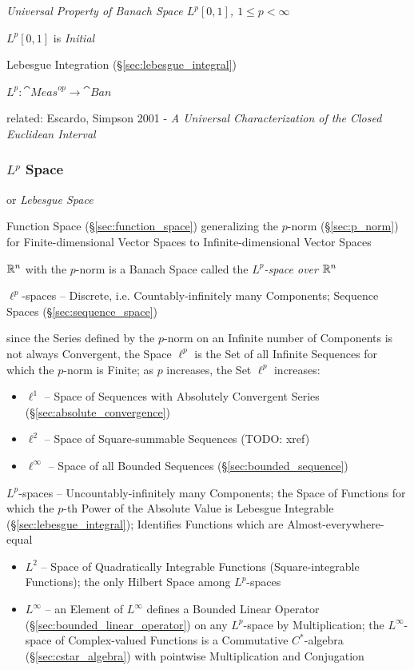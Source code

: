 \emph{Universal Property of Banach Space $L^p[0,1]$, $1 \leq p < \infty$}

$L^p[0,1]$ is \emph{Initial}

Lebesgue Integration (\S\ref{sec:lebesgue_integral})

$L^p : \cat{Meas}^{op} \to \cat{Ban}$

related: Escardo, Simpson 2001 - \emph{A Universal Characterization of the
Closed Euclidean Interval}



\subsubsection{$L^p$ Space}\label{sec:lp_space}

or \emph{Lebesgue Space}

Function Space (\S\ref{sec:function_space}) generalizing the $p$-norm
(\S\ref{sec:p_norm}) for Finite-dimensional Vector Spaces to
Infinite-dimensional Vector Spaces

$\mathbb{R}^n$ with the $p$-norm is a Banach Space called the
\emph{$L^p$-space over $\mathbb{R}^n$}

$\ell^p$-spaces -- Discrete, i.e. Countably-infinitely many Components; \fist
Sequence Spaces (\S\ref{sec:sequence_space})

since the Series defined by the $p$-norm on an Infinite number of Components is
not always Convergent, the Space $\ell^p$ is the Set of all Infinite Sequences
for which the $p$-norm is Finite; as $p$ increases, the Set $\ell^p$ increases:
\begin{itemize}
  \item $\ell^1$ -- Space of Sequences with Absolutely Convergent Series
    (\S\ref{sec:absolute_convergence})
  \item $\ell^2$ -- Space of Square-summable Sequences (TODO: xref)
  \item $\ell^\infty$ -- Space of all Bounded Sequences
    (\S\ref{sec:bounded_sequence})
\end{itemize}

$L^p$-spaces -- Uncountably-infinitely many Components; the Space of Functions
for which the $p$-th Power of the Absolute Value is Lebesgue Integrable
(\S\ref{sec:lebesgue_integral}); Identifies Functions which are
Almost-everywhere-equal

\begin{itemize}
  \item $L^2$ -- Space of Quadratically Integrable Functions (Square-integrable
    Functions); the only Hilbert Space among $L^p$-spaces
  \item $L^\infty$ -- an Element of $L^\infty$ defines a Bounded Linear Operator
    (\S\ref{sec:bounded_linear_operator}) on any $L^p$-space by Multiplication;
    the $L^\infty$-space of Complex-valued Functions is a Commutative
    $C^*$-algebra (\S\ref{sec:cstar_algebra}) with pointwise Multiplication and
    Conjugation
\end{itemize}


